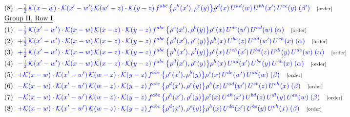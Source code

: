 \documentclass[9pt]{article}
\begin{document}
\begin{align}
&\quad\text{(8)}\ \ \textcolor{blue}{-\tfrac12\,\mathcal{K}(x-w)\cdot\mathcal{K}(x'-w')\,\mathcal{K}(w'-z)\cdot\mathcal{K}(y-z)\, f^{abc}\,\big\{\rho^{h}(x'),\rho^{e}(y)\big\}\rho^{d}(x)\,U^{ad}(w)\,U^{bh}(x')\,U^{ce}(y)\;(\beta')}\quad\text{\scriptsize[order]}\notag\\
&\quad\underline{\text{Group II, Row I}}\notag\\
&\quad\text{(1)}\ \ \textcolor{blue}{-\tfrac12\,\mathcal{K}(x'-w')\cdot\mathcal{K}(x-w)\,\mathcal{K}(x-z)\cdot\mathcal{K}(y-z)\, f^{abc}\,\big\{\rho^{e}(x'),\rho^{b}(y)\big\}\rho^{c}(x)\,U^{de}(w')\,U^{ad}(w)\;(\alpha)}\quad\text{\scriptsize[order]}\notag\\
&\quad\text{(2)}\ \ \textcolor{blue}{+\tfrac12\,\mathcal{K}(x'-w')\cdot\mathcal{K}(x-w)\,\mathcal{K}(x-z)\cdot\mathcal{K}(y-z)\, f^{abc}\,\big\{\rho^{d}(x'),\rho^{e}(y)\big\}\rho^{h}(x)\,U^{be}(z)\,U^{ad}(w')\,U^{ch}(x)\;(\alpha)}\quad\text{\scriptsize[order]}\notag\\
&\quad\text{(3)}\ \ \textcolor{blue}{+\tfrac12\,\mathcal{K}(x'-w')\cdot\mathcal{K}(x-w)\,\mathcal{K}(x-z)\cdot\mathcal{K}(y-z)\, f^{abc}\,\big\{\rho^{h}(x'),\rho^{l}(y)\big\}\rho^{c}(x)\,U^{eh}(x')\,U^{bd}(z)\,U^{dl}(y)\,U^{ae}(w)\;(\alpha)}\quad\text{\scriptsize[order]}\notag\\
&\quad\text{(4)}\ \ \textcolor{blue}{-\tfrac12\,\mathcal{K}(x'-w')\cdot\mathcal{K}(x-w)\,\mathcal{K}(x-z)\cdot\mathcal{K}(y-z)\, f^{abc}\,\big\{\rho^{d}(x'),\rho^{e}(y)\big\}\rho^{h}(x)\,U^{ad}(x')\,U^{be}(y)\,U^{ch}(x)\;(\alpha)}\quad\text{\scriptsize[order]}\notag\\
&\quad\text{(5)}\ \ \textcolor{blue}{+\mathcal{K}(x-w)\cdot\mathcal{K}(x'-w')\,\mathcal{K}(w-z)\cdot\mathcal{K}(y-z)\, f^{abc}\,\big\{\rho^{e}(x'),\rho^{b}(y)\big\}\rho^{c}(x)\,U^{de}(w')\,U^{ad}(w)\;(\beta)}\quad\text{\scriptsize[order]}\notag\\
&\quad\text{(6)}\ \ \textcolor{blue}{-\mathcal{K}(x-w)\cdot\mathcal{K}(x'-w')\,\mathcal{K}(w-z)\cdot\mathcal{K}(y-z)\, f^{abc}\,\big\{\rho^{d}(x'),\rho^{e}(y)\big\}\rho^{h}(x)\,U^{ad}(w')\,U^{eb}(z)\,U^{ch}(x)\;(\beta)}\quad\text{\scriptsize[order]}\notag\\
&\quad\text{(7)}\ \ \textcolor{blue}{-\mathcal{K}(x-w)\cdot\mathcal{K}(x'-w')\,\mathcal{K}(w-z)\cdot\mathcal{K}(y-z)\, f^{abc}\,\big\{\rho^{h}(x'),\rho^{l}(y)\big\}\rho^{c}(x)\,U^{eh}(x')\,U^{bd}(z)\,U^{dl}(y)\,U^{ea}(w)\;(\beta)}\quad\text{\scriptsize[order]}\notag\\
&\quad\text{(8)}\ \ \textcolor{blue}{+\mathcal{K}(x-w)\cdot\mathcal{K}(x'-w')\,\mathcal{K}(w-z)\cdot\mathcal{K}(y-z)\, f^{abc}\,\big\{\rho^{d}(x'),\rho^{e}(y)\big\}\rho^{h}(x)\,U^{da}(x')\,U^{be}(y)\,U^{ch}(x)\;(\beta)}\quad\text{\scriptsize[order]}\notag\\

\end{align}
\end{document}
